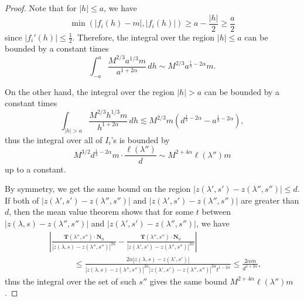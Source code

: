 \documentclass[reqno,centertags,12pt]{amsart}
\theoremstyle{definition}
\numberwithin{equation}{section}
\newcommand{\abs}[1]{\left\lvert#1\right\rvert}
\begin{document}
\begin{proof}
    Note that for $\abs{h}\leq a$, we have
    \[
        \min\left(\abs{f_{i}(h)-m},\abs{f_{i}(h)}\right)
        \geq a - \frac{\abs{h}}{2} \geq \frac{a}{2}
    \]
    since $\abs{f_{i}'(h)}\leq\frac{1}{2}$. Therefore, the integral over the region
    $\abs{h}\leq a$ can be bounded by a constant times
    \[
        \int_{-a}^{a}\frac{M^{2/3}a^{1/3}m}{a^{1+2\alpha}}\,dh
        \sim M^{2/3}a^{\frac{1}{3}-2\alpha}m.
    \]

    On the other hand, the integral over the region $\abs{h}>a$ can be bounded by
    a constant times
    \[
        \int_{\abs{h}>a}\frac{M^{2/3}h^{1/3}m}{h^{1+2\alpha}}\,dh
        \lesssim M^{2/3}m\left(d^{\frac{1}{3}-2\alpha} - a^{\frac{1}{3}-2\alpha}\right),
    \]
    thus the integral over all of $I_{i}$'s is bounded by
    \[
        M^{3/2}d^{\frac{1}{3}-2\alpha}m
        \cdot \frac{\ell(\lambda'')}{d}
        \sim M^{2+4\alpha}\ell(\lambda'')m
    \]
    up to a constant.
    
    By symmetry, we get the same bound on the region
    $\abs{z(\lambda',s') - z(\lambda'',s'')}\leq d$. If both of
    $\abs{z(\lambda',s') - z(\lambda'',s'')}$ and $\abs{z(\lambda',s') - z(\lambda'',s'')}$
    are greater than $d$, then the mean value theorem shows that for some
    $t$ between $\abs{z(\lambda,s) - z(\lambda'',s'')}$ and
    $\abs{z(\lambda',s') - z(\lambda'',s'')}$, we have
    \begin{align*}
        &\abs{\frac{\mathbf{T}(\lambda'',s'')\cdot\mathbf{N}_{0}}
        {\abs{z(\lambda,s) - z(\lambda'',s'')}^{2\alpha}}
        - \frac{\mathbf{T}(\lambda'',s'')\cdot\mathbf{N}_{0}}
        {\abs{z(\lambda',s') - z(\lambda'',s'')}^{2\alpha}}} \\
        &\quad\quad\quad
        \leq \frac{2\alpha\abs{z(\lambda,s) - z(\lambda',s')}}
        {\abs{z(\lambda,s) - z(\lambda'',s'')}^{2\alpha}
        \abs{z(\lambda',s') - z(\lambda'',s'')}^{2\alpha}
        t^{1-2\alpha}}
        \leq \frac{2\alpha m}{d^{1+2\alpha}},
    \end{align*}
    thus the integral over the set of such $s''$ gives the same bound
    $M^{2+4\alpha}\ell(\lambda'')m$.
\end{proof}
\end{document}
